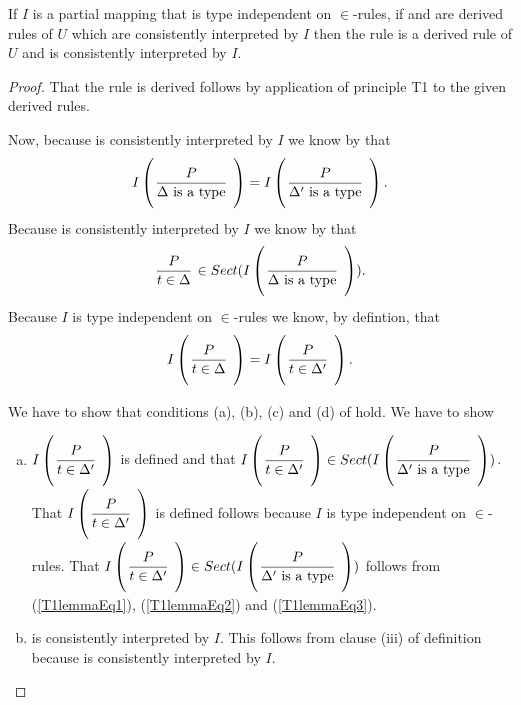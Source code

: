 \begin{lemma}
If $I$ is a partial mapping that is type independent on $\in$-rules,
if  and  are derived rules of $U$ 
which are consistently interpreted by $I$ then the rule 
is a derived rule of $U$ and is consistently interpreted by $I$.
\end{lemma}
\begin{proof}
That the rule  is derived follows by application of principle T1 to the given derived rules.

Now, because  is consistently interpreted by $I$ we know by  that
\begin{equation}
\label{T1lemmaEq1}
\Imap{\gatdisplayrule{P}{\isT{\Delta}}} = \Imap{\gatdisplayrule{P}{\isT{\Delta'}}}.
\end{equation}
Because  is consistently interpreted by $I$ we know by  that
\begin{equation}
\label{T1lemmaEq2}
\gatdisplayrule{P}{\ofT{t}{\Delta}} \in Sect(\Imap{\gatdisplayrule{P}{\isT{\Delta}}}).
\end{equation}
Because $I$ is type independent on $\in$-rules we know, by defintion,  that
\begin{equation}
\label{T1lemmaEq3}
\Imap{\gatdisplayrule{P}{\ofT{t}{\Delta}}} = \Imap{\gatdisplayrule{P}{\ofT{t}{\Delta'}}}.
\end{equation}

We have to show that conditions (a), (b), (c) and (d) of  hold. We have to show
\begin{enumerate}[(a)]
\item $\Imap{\gatdisplayrule{P}{\ofT{t}{\Delta'}}}$ is defined
and that $\Imap{\gatdisplayrule{P}{\ofT{t}{\Delta'}}} \in Sect(\Imap{\gatdisplayrule{P}{\isT{\Delta'}}})$.
That  $\Imap{\gatdisplayrule{P}{\ofT{t}{\Delta'}}}$ is defined follows because
$I$ is type independent on $\in$-rules.
 That $\Imap{\gatdisplayrule{P}{\ofT{t}{\Delta'}}} \in Sect(\Imap{\gatdisplayrule{P}{\isT{\Delta'}}})$
  follows from (\ref{T1lemmaEq1}), (\ref{T1lemmaEq2}) and (\ref{T1lemmaEq3}).\\
\item
{} is consistently interpreted by $I$. This  follows from clause (iii) of
definition  because  is consistently interpreted by $I$.


\end{enumerate}
\end{proof}
